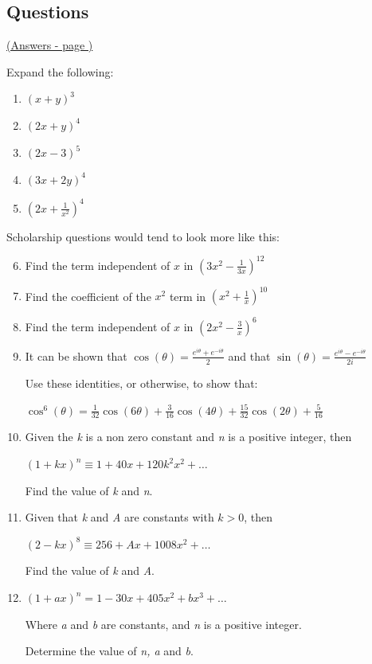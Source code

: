 \documentclass[../main.tex]{subfiles}
\begin{document}
\pagebreak
\hypertarget{binomialexpansionlink}{\subsection*{Questions}}
\hyperlink{binomialexpansionanswers}{(Answers - page {\pageref*{Binomial expansion answers}})}

\label{Binomial Expansion}

Expand the following:

\begin{enumerate}
    \item \( (x+y)^3 \)
    \item \( (2x+y)^4 \)
    \item \( (2x-3)^5 \)
    \item \( (3x+2y)^4 \)
    \item \( (2x + \frac{1}{x^2 } )^4 \)
\end{enumerate}

Scholarship questions would tend to look more like this:

\begin{enumerate}
    \setcounter{enumi}{5}
    \item Find the term independent of \( x \) in \( (3x^2 - \frac{1}{3x})^{12}  \)
    \item Find the coefficient of the \( x^2 \) term in \( (x^2 + \frac{1}{x})^{10} \)
    \item Find the term independent of \( x \) in \( (2x^2 - \frac{3}{x})^6 \)
    \item It can be shown that \( \cos(\theta) = \frac{e^{i\theta}+e^{-i\theta}}{2}\) and that \( \sin(\theta) = \frac{e^{i\theta}-e^{-i\theta}}{2i}\)
   
    Use these identities, or otherwise, to show that:

    \( \cos^6(\theta) = \frac{1}{32}\cos(6\theta) + \frac{3}{16}\cos(4\theta)+\frac{15}{32}\cos(2\theta)+\frac{5}{16}\)

    \item Given the \textit{k} is a non zero constant and \textit{n} is a positive integer, then
    
    \( (1+kx)^n \equiv 1+40x+120k^2x^2+\dots\)

    Find the value of \textit{k} and \textit{n}.

    \item Given that \textit{k} and \textit{A} are constants with \(k>0\), then
    
    \( (2-kx)^8 \equiv 256+Ax+1008x^2+\dots\)

    Find the value of \textit{k} and \textit{A}.

    \item \( (1+ax)^n = 1-30x+405x^2+bx^3+\dots \)
    
    Where \textit{a} and \textit{b} are constants, and \textit{n} is a positive integer.

    Determine the value of \textit{n, a} and \textit{b}.
\end{enumerate}
\end{document}
